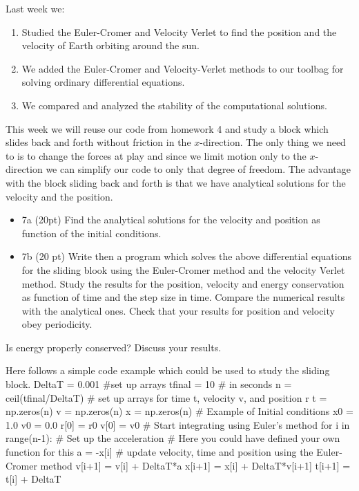 \documentclass[%
oneside,                 %
final,                   %
10pt]{article}
\begin{document}
Last week we:
\begin{enumerate}
\item Studied  the Euler-Cromer and Velocity Verlet  to find the position and the velocity of  Earth orbiting around the sun.

\item We added the Euler-Cromer and Velocity-Verlet methods to our toolbag for solving ordinary differential equations.

\item We compared and analyzed the stability of the  computational solutions.
\end{enumerate}

\noindent
This week we will reuse our code from homework 4 and study a block
which slides back and forth without friction in the $x$-direction.
The only thing we need to is to change the forces at play and since we
limit motion only to the $x$-direction we can simplify our code to
only that degree of freedom.
The advantage with the block sliding back and forth is that we have analytical solutions for the velocity and the position. 


\begin{itemize}
\item 7a (20pt) Find the analytical solutions for the velocity and position as function of the initial conditions. 

\item 7b (20 pt)  Write then a program which solves the above differential equations for the sliding blook using the Euler-Cromer  method and the velocity Verlet method. Study the results for the position, velocity and energy conservation as function of time and the step size in time. Compare the numerical results with the analytical ones. Check that your results for position and velocity obey periodicity. 
\end{itemize}

\noindent
Is energy properly conserved? Discuss your results. 

Here follows a simple code example which could be used to study the sliding block.
\bpycod
DeltaT = 0.001
#set up arrays 
tfinal = 10 # in seconds
n = ceil(tfinal/DeltaT)
# set up arrays for time t, velocity v, and position r
t = np.zeros(n)
v = np.zeros(n)
x = np.zeros(n)
# Example of Initial conditions
x0 = 1.0
v0 = 0.0
r[0] = r0
v[0] = v0
# Start integrating using Euler's method
for i in range(n-1):
    # Set up the acceleration
    # Here you could have defined your own function for this
    a = -x[i]
    # update velocity, time and position using the Euler-Cromer method
    v[i+1] = v[i] + DeltaT*a
    x[i+1] = x[i] + DeltaT*v[i+1]
    t[i+1] = t[i] + DeltaT
\epycod
\end{document}
